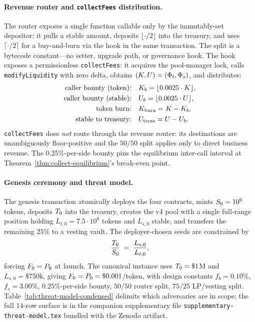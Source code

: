 \paragraph{Revenue router and \texttt{collectFees} distribution.} The router exposes a single function callable only by the immutably-set depositor: it pulls a stable amount, deposits $\lfloor \cdot/2 \rfloor$ into the treasury, and uses $\lceil \cdot/2 \rceil$ for a buy-and-burn via the hook in the same transaction. The split is a bytecode constant---no setter, upgrade path, or governance hook. The hook exposes a permissionless \texttt{collectFees}: it acquires the pool-manager lock, calls \texttt{modifyLiquidity} with zero delta, obtains $(K, U) = (\Phi_t, \Phi_s)$, and distributes:
\begin{align}
\text{caller bounty (token):} \quad & K_b = \lfloor 0.0025 \cdot K \rfloor, \\
\text{caller bounty (stable):} \quad & U_b = \lfloor 0.0025 \cdot U \rfloor, \\
\text{token burn:} \quad & K_{\text{burn}} = K - K_b, \\
\text{stable to treasury:} \quad & U_{\text{treas}} = U - U_b.
\end{align}
\texttt{collectFees} does \emph{not} route through the revenue router: its destinations are unambiguously floor-positive and the $50/50$ split applies only to direct business revenue. The $0.25\%$-per-side bounty pins the equilibrium inter-call interval at Theorem~\ref{thm:collect-equilibrium}'s break-even point.

\paragraph{Genesis ceremony and threat model.} The genesis transaction atomically deploys the four contracts, mints $S_0 = 10^9$ tokens, deposits $T_0$ into the treasury, creates the v4 pool with a single full-range position holding $L_{t,0} = 7.5 \cdot 10^8$ tokens and $L_{s,0}$ stable, and transfers the remaining $25\%$ to a vesting vault. The deployer-chosen seeds are constrained by
\begin{equation}
\frac{T_0}{S_0} \;=\; \frac{L_{s,0}}{L_{t,0}},
\label{eq:genesis-constraint}
\end{equation}
forcing $F_0 = P_0$ at launch. The canonical instance uses $T_0 = \$1$M and $L_{s,0} = \$750$k, giving $F_0 = P_0 = \$0.001$/token, with design constants $f_b = 0.10\%$, $f_s = 3.00\%$, $0.25\%$-per-side bounty, $50/50$ router split, $75/25$ LP/vesting split. Table~\ref{tab:threat-model-condensed} delimits which adversaries are in scope; the full $14$-row surface is in the companion supplementary file \texttt{supplementary-threat-model.tex} bundled with the Zenodo artifact.

